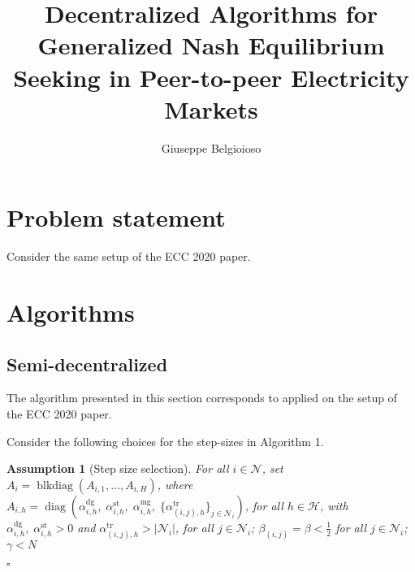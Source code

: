 \documentclass[10pt]{article}
\title{Decentralized Algorithms for Generalized Nash Equilibrium Seeking in Peer-to-peer Electricity Markets}
\author{Giuseppe Belgioioso}
\newtheorem{assumption}{Assumption}{\it}{}
\newcommand{\mc}{\mathcal}
\newcommand{\diag}{\operatorname{diag}}
\newcommand{\blkdiag}{\operatorname{blkdiag}}
\newcommand{\0}{\mathbf{0}}
\newcommand{\1}{\mathbf{1}}
\begin{document}
\maketitle

\section{Problem statement}
Consider the same setup of the ECC 2020 paper.


\section{Algorithms}
\subsection{Semi-decentralized}

The algorithm presented in this section corresponds to \cite[Alg. 1]{belgioioso2018projected} applied on the setup of the ECC 2020 paper.

Consider the following choices for the step-sizes in Algorithm 1.
\smallskip

\begin{assumption}[Step size selection]\label{ass:SS-choice2}
For all $i \in \mc N$, set $A_i = \blkdiag(  A_{i,1},\ldots, A_{i,H})$, where $A_{i,h} = \diag \left(
\alpha_{i,h}^{\mathrm{dg}},  \; \alpha_{i,h}^{\mathrm{st}},\;  \alpha_{i,h}^{\mathrm{mg}}, \; \{ \alpha_{(i,j),h}^{\mathrm{tr}} \}_{j\in\mathcal{N}_i} \right)$, for all $ h \in \mc H$, with $\alpha_{i,h}^{\mathrm{dg}}, \; \alpha_{i,h}^{\mathrm{st}}>0$ and $\alpha_{(i,j),h}^{\mathrm{tr}} > |\mc N_i|$, for all $ j \in \mc N_i$; $\beta_{(i,j)} = \beta < \frac{1}{2}$ for all $j \in \mc N_i $; $\gamma < N$

{\hfill $\square$}
\end{assumption}
\end{document}
